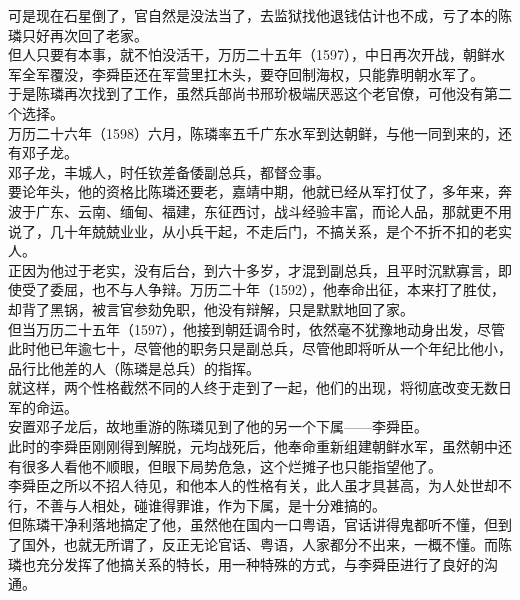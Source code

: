\begin{multicols}{\theparacolNo}
可是现在石星倒了，官自然是没法当了，去监狱找他退钱估计也不成，亏了本的陈璘只好再次回了老家。\\

但人只要有本事，就不怕没活干，万历二十五年（1597），中日再次开战，朝鲜水军全军覆没，李舜臣还在军营里扛木头，要夺回制海权，只能靠明朝水军了。\\

于是陈璘再次找到了工作，虽然兵部尚书邢玠极端厌恶这个老官僚，可他没有第二个选择。\\

万历二十六年（1598）六月，陈璘率五千广东水军到达朝鲜，与他一同到来的，还有邓子龙。\\

邓子龙，丰城人，时任钦差备倭副总兵，都督佥事。\\

要论年头，他的资格比陈璘还要老，嘉靖中期，他就已经从军打仗了，多年来，奔波于广东、云南、缅甸、福建，东征西讨，战斗经验丰富，而论人品，那就更不用说了，几十年兢兢业业，从小兵干起，不走后门，不搞关系，是个不折不扣的老实人。\\

正因为他过于老实，没有后台，到六十多岁，才混到副总兵，且平时沉默寡言，即使受了委屈，也不与人争辩。万历二十年（1592），他奉命出征，本来打了胜仗，却背了黑锅，被言官参劾免职，他没有辩解，只是默默地回了家。\\

但当万历二十五年（1597），他接到朝廷调令时，依然毫不犹豫地动身出发，尽管此时他已年逾七十，尽管他的职务只是副总兵，尽管他即将听从一个年纪比他小，品行比他差的人（陈璘是总兵）的指挥。\\

就这样，两个性格截然不同的人终于走到了一起，他们的出现，将彻底改变无数日军的命运。\\

安置邓子龙后，故地重游的陈璘见到了他的另一个下属——李舜臣。\\

此时的李舜臣刚刚得到解脱，元均战死后，他奉命重新组建朝鲜水军，虽然朝中还有很多人看他不顺眼，但眼下局势危急，这个烂摊子也只能指望他了。\\

李舜臣之所以不招人待见，和他本人的性格有关，此人虽才具甚高，为人处世却不行，不善与人相处，碰谁得罪谁，作为下属，是十分难搞的。\\

但陈璘干净利落地搞定了他，虽然他在国内一口粤语，官话讲得鬼都听不懂，但到了国外，也就无所谓了，反正无论官话、粤语，人家都分不出来，一概不懂。而陈璘也充分发挥了他搞关系的特长，用一种特殊的方式，与李舜臣进行了良好的沟通。\\


\end{multicols}
